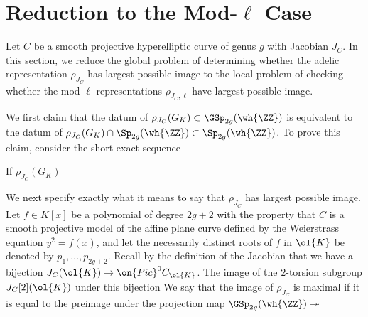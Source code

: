 \section{Reduction to the Mod-$\ell$ Case}
	




    Let $C$ be a smooth projective hyperelliptic curve of genus $g$ with Jacobian $J_C$. In this section, we reduce the global problem of determining whether the adelic representation $\rho_{J_C}$ has largest possible image to the local problem of checking whether the mod-$\ell$ representations $\rho_{J_C,\ell}$ have largest possible image.

    We first claim that the datum of $\rho_{J_C}(G_K) \subset \GSp_{2g}(\wh{\ZZ})$ is equivalent to the datum of $\rho_{J_C}(G_K) \cap \Sp_{2g}(\wh{\ZZ}) \subset \Sp_{2g}(\wh{\ZZ})$. To prove this claim, consider the short exact sequence

    \begin{center}
    \end{center}

    If     $\rho_{J_C}(G_K)$ 

    We next specify exactly what it means to say that $\rho_{J_C}$ has largest possible image. Let $f \in K[x]$ be a polynomial of degree $2g+2$ with the property that $C$ is a smooth projective model of the affine plane curve defined by the Weierstrass equation $y^2 = f(x)$, and let the necessarily distinct roots of $f$ in $\ol{K}$ be denoted by $p_1, \dots, p_{2g+2}$. Recall by the definition of the Jacobian that we have a bijection $J_C(\ol{K}) \to \on{Pic}^0 C_{\ol{K}}$. The image of the $2$-torsion subgroup $J_C[2](\ol{K})$ under this bijection
    We say that the image of $\rho_{J_C}$ is maximal if it is equal to the preimage under the projection map $\GSp_{2g}(\wh{\ZZ}) \twoheadrightarrow$


